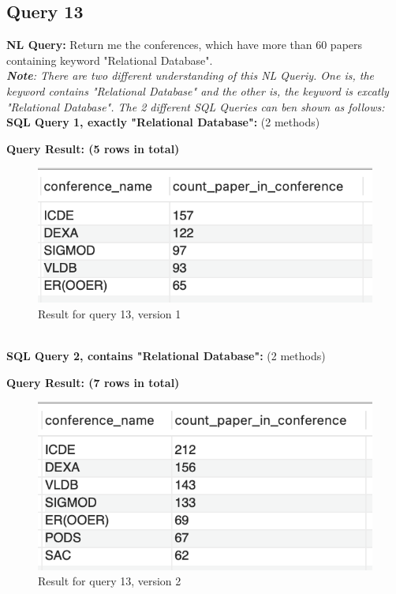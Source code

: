 \documentclass{article}
\begin{document}
\subsection{Query 13}
\textbf{NL Query:}   Return me the conferences, which have more than 60 papers containing keyword "Relational Database".
\vspace{6 pt}
\\
\textit{\textbf{Note}: There are two different understanding of this NL Queriy. One is, the keyword contains "Relational Database" and the other is, the keyword is excatly "Relational Database". The 2 different SQL Queries can ben shown as follows:}
\vspace{6pt}
\\
\textbf{SQL Query 1, exactly "Relational Database":} (2 methods)

\textbf{Query Result: (5 rows in total)}
\begin{figure}[h]
	\centering
	\includegraphics[width=.23\textheight]{figures/q13_res1.png}
	\caption{Result for query 13, version 1}
	\label{fig:014}
\end{figure}
\\
\textbf{SQL Query 2, contains "Relational Database":} (2 methods)

\textbf{Query Result: (7 rows in total)}
\begin{figure}[h]
	\centering
	\includegraphics[width=.23\textheight]{figures/q13_res2.png}
	\caption{Result for query 13, version 2}
	\label{fig:018}
\end{figure}
\end{document}
